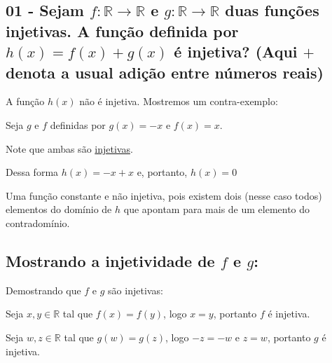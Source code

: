 \noindent
\subsection*{01 - Sejam 
$ f \colon \mathbb{R} \to \mathbb{R} $ 
e 
$ g \colon \mathbb{R} \to \mathbb{R} $ 
duas funções injetivas. A função  definida por 
$ h(x) = f (x) + g(x) $
é injetiva? (Aqui $+$ denota a usual adição entre números reais)
}

A função $ h(x) $ não é injetiva. Mostremos um contra-exemplo:

Seja $ g $ e $ f $ definidas por $ g(x) = -x $ e $ f(x) = x $. 

Note que ambas são \hyperlink{injetivas}{injetivas}.

Dessa forma $ h(x) = -x + x $ e, portanto, $ h(x) = 0 $

Uma função constante e não injetiva, pois existem dois (nesse caso todos) elementos do domínio de $ h $ que apontam para mais de um elemento do contradomínio.

\begin{comment}

\begin{tikzpicture}
\foreach \x in {1,2,3}{
	\node[fill,circle,inner sep=2pt] (d\x) at (0,\x) {};
}
\node[fit=(d1) (d2) (d3),ellipse,draw,minimum width=2cm, minimum height = 3cm] {}; 

\foreach \x[count=\xi] in {0.75}{
	\node[fill,circle,inner sep=2pt] (c\xi) at (4,\x) {};
}
\node[fit=(c1) (c1) (c1) ,ellipse,draw,minimum width=1.5cm, minimum height = 3cm] {};
\draw[-latex] (d1) -- (c1);
\draw[-latex] (d2) -- (c1);
\draw[-latex] (d3) -- (c1);
\end{tikzpicture}

\end{comment}

\subsection*{Mostrando a injetividade de $ f $ e $ g $:}

Demostrando que $ f $ e $ g $ são \hypertarget{injetivas}{injetivas}:

Seja $ x, y \in \mathbb{R} $ tal que $ f(x) = f(y) $, logo $ x = y $, portanto $ f $ é injetiva.

Seja $ w, z \in \mathbb{R} $ tal que $ g(w) = g(z) $, logo $ -z = -w $ e $ z = w $, portanto $ g $ é injetiva.

